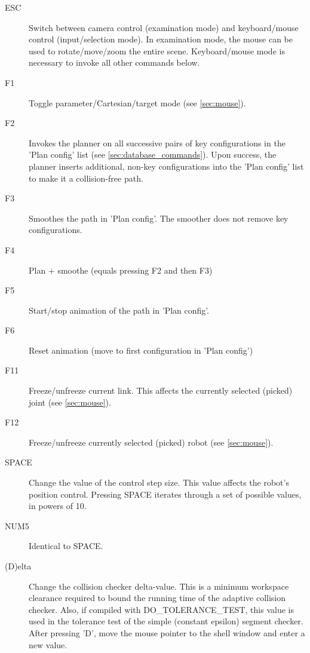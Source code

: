 \documentclass[letter,12pt]{article}
\begin{document}
\begin{description}
  
\item[ESC] Switch between camera control (examination mode) and
  keyboard/mouse control (input/selection mode).  In examination mode,
  the mouse can be used to rotate/move/zoom the entire scene.
  Keyboard/mouse mode is necessary to invoke all other commands below.
  
\item[F1] Toggle parameter/Cartesian/target mode (see
  \ref{sec:mouse}).
  
\item[F2] Invokes the planner on all successive pairs of key
  configurations in the 'Plan config' list (see
  \ref{sec:database_commands}).  Upon success, the planner inserts
  additional, non-key configurations into the 'Plan config' list to
  make it a collision-free path.
   
\item[F3] Smoothes the path in 'Plan config'.  The smoother does not
  remove key configurations.

\item[F4] Plan + smoothe (equals pressing F2 and then F3)

\item[F5] Start/stop animation of the path in 'Plan config'.

\item[F6] Reset animation (move to first configuration in 'Plan config')
  
\item[F11] Freeze/unfreeze current link.  This affects the currently
  selected (picked) joint (see \ref{sec:mouse}).
  
\item[F12] Freeze/unfreeze currently selected (picked) robot (see
  \ref{sec:mouse}).
 
\item[SPACE] Change the value of the control step size.  This value
  affects the robot's position control.  Pressing SPACE iterates
  through a set of possible values, in powers of 10.

\item[NUM5] Identical to SPACE.
  
\item[(D)elta] Change the collision checker delta-value.  This is a
  minimum workspace clearance required to bound the running time of
  the adaptive collision checker.  Also, if compiled with
  DO_TOLERANCE_TEST, this value is used in the tolerance test of the
  simple (constant epsilon) segment checker.  After pressing 'D', move
  the mouse pointer to the shell window and enter a new value.
  

\end{description}
\end{document}

